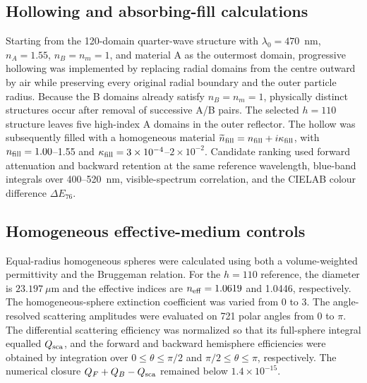 
\subsection{Hollowing and absorbing-fill calculations}
\label{sec:hollowing_methods}
Starting from the 120-domain quarter-wave structure with $\lambda_0=470$~nm,
$n_A=1.55$, $n_B=n_m=1$, and material A as the outermost domain, progressive
hollowing was implemented by replacing radial domains from the centre outward by
air while preserving every original radial boundary and the outer particle radius.
Because the B domains already satisfy $n_B=n_m=1$, physically distinct structures
occur after removal of successive A/B pairs. The selected $h=110$ structure leaves
five high-index A domains in the outer reflector. The hollow was subsequently filled
with a homogeneous material $\widetilde n_{\rm fill}=n_{\rm fill}+i\kappa_{\rm fill}$,
with $n_{\rm fill}=1.00$--1.55 and $\kappa_{\rm fill}=3\times10^{-4}$--$2\times10^{-2}$.
Candidate ranking used forward attenuation and backward retention at the same
reference wavelength, blue-band integrals over 400--520~nm, visible-spectrum
correlation, and the CIELAB colour difference $\Delta E_{76}$.

\subsection{Homogeneous effective-medium controls}
\label{sec:homogeneous_controls_methods}
Equal-radius homogeneous spheres were calculated using both a volume-weighted
permittivity and the Bruggeman relation. For the $h=110$ reference, the diameter is
$23.197~\mu$m and the effective indices are $n_{\rm eff}=1.0619$ and 1.0446,
respectively. The homogeneous-sphere extinction coefficient was varied from 0 to 3.
The angle-resolved scattering amplitudes were evaluated on 721 polar angles from
0 to $\pi$. The differential scattering efficiency was normalized so that its
full-sphere integral equalled $Q_{\rm sca}$, and the forward and backward hemisphere
efficiencies were obtained by integration over $0\leq\theta\leq\pi/2$ and
$\pi/2\leq\theta\leq\pi$, respectively. The numerical closure
$Q_F+Q_B-Q_{\rm sca}$ remained below $1.4\times10^{-15}$.

